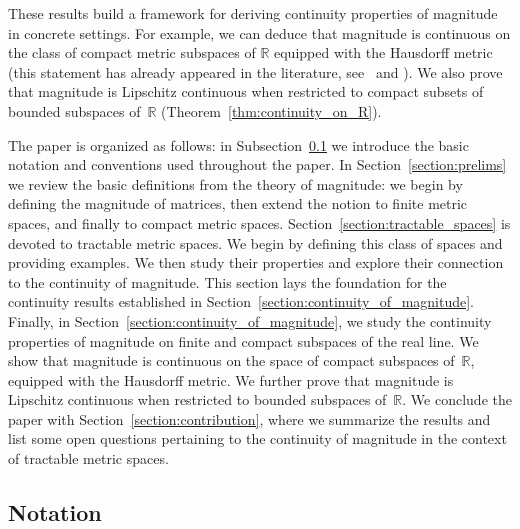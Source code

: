 \documentclass[11pt]{article}
\theoremstyle{plain}
\newtheorem*{conjecture*}{Conjecture}
\theoremstyle{definition}
\newcommand{\RR}{\mathbb{R}}
\newcommand{\mg}[1][]{\mathsf{mag}_{#1}}
\begin{document}
These results build a framework for deriving continuity properties of magnitude in concrete settings. For example, we can deduce that magnitude is continuous on the class of compact metric subspaces of $\RR$ equipped with the Hausdorff metric (this statement has already appeared in the literature, see~\cite[Corollary 5.3.13]{LM17} and \cite[Corollary 2.12]{meckes2013}). We also prove that magnitude is Lipschitz continuous when restricted to compact subsets of bounded subspaces of~\(\mathbb{R}\) (Theorem~\ref{thm:continuity_on_R}).



The paper is organized as follows: in Subsection~\ref{sub:notation} we introduce the basic notation and conventions used throughout the paper. In Section~\ref{section:prelims} we review the basic definitions from the theory of magnitude: we begin by defining the magnitude of matrices, then extend the notion to finite metric spaces, and finally to compact metric spaces. 
Section~\ref{section:tractable_spaces} is devoted to tractable metric spaces. We begin by defining this class of spaces and providing examples. We then study their properties and explore their connection to the continuity of magnitude. This section lays the foundation for the continuity results established in Section~\ref{section:continuity_of_magnitude}.
Finally, in Section~\ref{section:continuity_of_magnitude}, we study the continuity properties of magnitude on finite and compact subspaces of the real line. We show that magnitude is continuous on the space of compact subspaces of~$\RR$, equipped with the Hausdorff metric. We further prove that magnitude is Lipschitz continuous when restricted to bounded subspaces of~$\RR$. We conclude the paper with Section~\ref{section:contribution}, where we summarize the results and list some open questions pertaining to the continuity of magnitude in the context of tractable metric spaces.

\subsection{Notation}\label{sub:notation}
\end{document}
